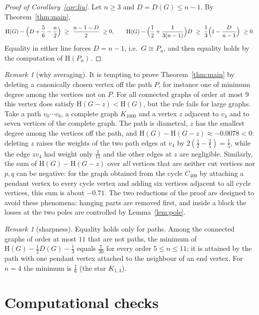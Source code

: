 \documentclass[11pt]{article}
\theoremstyle{definition}
\theoremstyle{remark}
\newtheorem{remark}[theorem]{Remark}
\newcommand{\Hm}{\mathrm{H}}
\newcommand{\D}{D}
\begin{document}
\begin{proof}[Proof of Corollary~\ref{cor:liu}]
Let $n\ge3$ and $\D=\D(G)\le n-1$. By Theorem~\ref{thm:main},
\[
 \Hm(G)-\Bigl(\D+\frac56-\frac n2\Bigr)\ \ge\ \frac{n-1-\D}{2}\ \ge0,\qquad
 \Hm(G)-\Bigl(\frac12+\frac1{3(n-1)}\Bigr)\D\ \ge\ \frac13\Bigl(1-\frac{\D}{n-1}\Bigr)\ \ge0 .
\]
Equality in either line forces $\D=n-1$, i.e.\ $G\cong P_n$, and then equality holds by the
computation of $\Hm(P_n)$.
\end{proof}

\begin{remark}[why averaging]\label{rem:rules}
It is tempting to prove Theorem~\ref{thm:main} by deleting a canonically chosen vertex off the
path $P$, for instance one of minimum degree among the vertices not on $P$. For all connected
graphs of order at most $9$ this vertex does satisfy $\Hm(G-z)<\Hm(G)$, but the rule fails for
large graphs. Take a path $v_0\cdots v_8$, a complete graph $K_{1000}$ and a vertex $z$
adjacent to $v_4$ and to seven vertices of the complete graph. The path is diametral, $z$ has
the smallest degree among the vertices off the path, and $\Hm(G)-\Hm(G-z)\approx-0.0078<0$:
deleting $z$ raises the weights of the two path edges at $v_4$ by
$2(\frac12-\frac25)=\frac15$, while the edge $zv_4$ had weight only $\frac2{11}$ and the
other edges at $z$ are negligible. Similarly, the sum of $\Hm(G)-\Hm(G-z)$ over \emph{all}
vertices that are neither cut vertices nor $p,q$ can be negative: for the graph obtained from
the cycle $C_{400}$ by attaching a pendant vertex to every cycle vertex and adding six
vertices adjacent to all cycle vertices, this sum is about $-0.71$. The two reductions of the
proof are designed to avoid these phenomena: hanging parts are removed first, and inside a
block the losses at the two poles are controlled by Lemma~\ref{lem:pole}.
\end{remark}

\begin{remark}[sharpness]
Equality holds only for paths. Among the connected graphs of order at most $11$ that are not
paths, the minimum of $\Hm(G)-\frac12\D(G)-\frac13$ equals $\frac7{30}$ for every order
$5\le n\le11$; it is attained by the path with one pendant vertex attached to the neighbour of
an end vertex. For $n=4$ the minimum is $\frac16$ (the star $K_{1,3}$).
\end{remark}

\section{Computational checks}\label{sec:computation}
\end{document}
